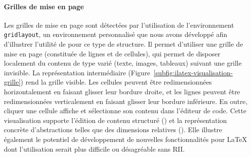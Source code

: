 \paragraph{Grilles de mise en page}
Les grilles de mise en page sont détectées par l'utilisation de l'environnement \texttt{gridlayout}, un environnement personnalisé que nous avons développé afin d'illustrer l'utilité de \iLaTeX{} pour ce type de structure.
Il permet d'utiliser une grille de mise en page (constituée de lignes et de cellules), qui permet de disposer localement du contenu de type varié (\eg texte, images, tableaux) suivant une grille invisible.
La représentation intermédiaire (Figure~\ref{subfig:ilatex-visualisation-grille}) rend la grille visible.
Les cellules peuvent être redimensionnées horizontalement en faisant glisser leur bordure droite, et les lignes peuvent être redimensionnées verticalement en faisant glisser leur bordure inférieure.
En outre, cliquer une cellule affiche et sélectionne son contenu dans l'éditeur de code.
Cette visualisation supporte l'édition de contenu structuré () et la représentation concrète d'abstractions telles que des dimensions relatives ().
Elle illustre également le potentiel de développement de nouvelles fonctionnalités pour \LaTeX{} dont l'utilisation serait plus difficile ou désagréable sans RII.


